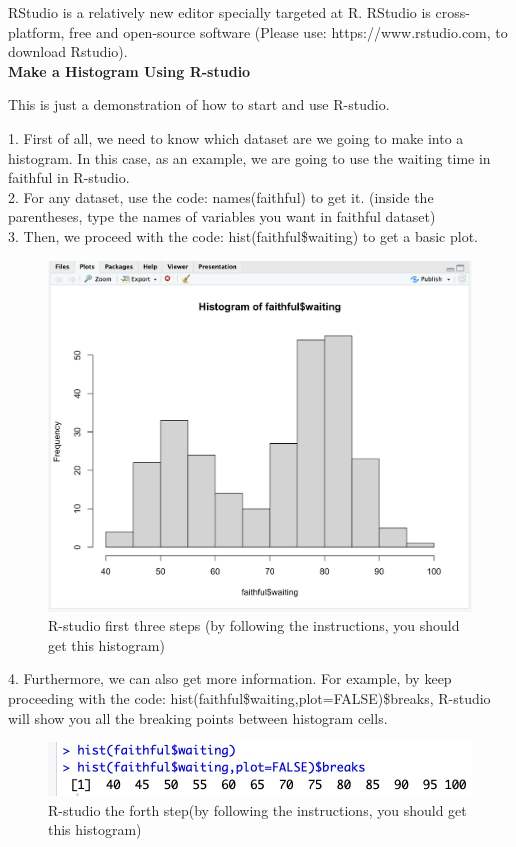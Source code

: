 RStudio is a relatively new editor specially targeted at R. RStudio is cross-platform, free and open-source software (Please use: https://www.rstudio.com, to download Rstudio).\\

\textbf{Make a Histogram Using R-studio}

This is just a demonstration of how to start and use R-studio. 

1. First of all, we need to know which dataset are we going to make into a histogram. In this case, as an example, we are going to use the waiting time in faithful in R-studio.\\
2. For any dataset, use the code: names(faithful) to get it. (inside the parentheses, type the names of variables you want in faithful dataset)\\
3. Then, we proceed with the code: hist(faithful\$waiting) to get a basic plot.\\

\begin{figure}[H]
 \centering
 \includegraphics[scale=0.45]{Section1/img/R1.jpg}
 \caption{R-studio first three steps (by following the instructions, you should get this histogram)}
\end{figure}

4. Furthermore, we can also get more information. For example, by keep proceeding with the code: hist(faithful\$waiting,plot=FALSE)\$breaks, R-studio will show you all the breaking points between histogram cells.

\begin{figure}[H]
 \centering
 \includegraphics[scale=0.45]{Section1/img/R2.jpg}
 \caption{R-studio the forth step(by following the instructions, you should get this histogram)}
 \end{figure}
